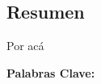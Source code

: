 \rhead{}
\lhead{}
\renewcommand{\headrulewidth}{0pt}
\begin{center}
    \section*{Resumen}
\end{center}

Por acá

\vfill


\textbf{Palabras Clave:} 